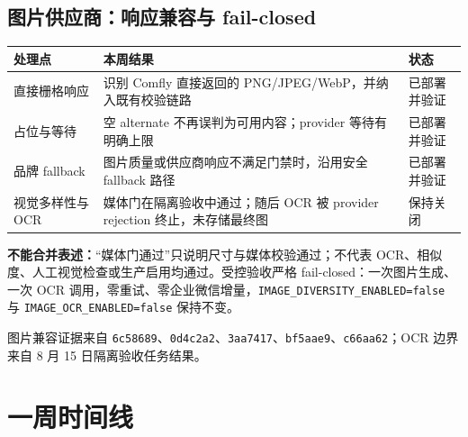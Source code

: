 \documentclass[UTF8,11pt,a4paper,fontset=none]{ctexart}
\begin{document}
\subsection{图片供应商：响应兼容与 fail-closed}
\noindent\begin{tabularx}{\textwidth}{L{3.1cm}Y L{3.0cm}}\toprule
{}\color{white}\bfseries\sffamily 处理点&\color{white}\bfseries\sffamily 本周结果&\color{white}\bfseries\sffamily 状态\\\midrule
直接栅格响应&识别 Comfly 直接返回的 PNG/JPEG/WebP，并纳入既有校验链路&已部署并验证\\
占位与等待&空 alternate 不再误判为可用内容；provider 等待有明确上限&已部署并验证\\
品牌 fallback&图片质量或供应商响应不满足门禁时，沿用安全 fallback 路径&已部署并验证\\
视觉多样性与 OCR&媒体门在隔离验收中通过；随后 OCR 被 provider rejection 终止，未存储最终图&保持关闭\\\bottomrule\end{tabularx}
\begin{boundarybox}
\textbf{不能合并表述：}“媒体门通过”只说明尺寸与媒体校验通过；不代表 OCR、相似度、人工视觉检查或生产启用均通过。受控验收严格 fail-closed：一次图片生成、一次 OCR 调用，零重试、零企业微信增量，\texttt{IMAGE\_DIVERSITY\_ENABLED=false} 与 \texttt{IMAGE\_OCR\_ENABLED=false} 保持不变。
\end{boundarybox}
\noindent 图片兼容证据来自 \texttt{6c58689}、\texttt{0d4c2a2}、\texttt{3aa7417}、\texttt{bf5aae9}、\texttt{c66aa62}；OCR 边界来自 8 月 15 日隔离验收任务结果。
\section{一周时间线}
\begin{center}
\end{center}
\newpage
\end{document}
